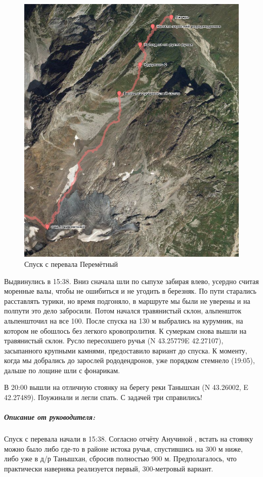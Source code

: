 \begin{figure}[h!]
	\centering
	\includegraphics[width=0.7\linewidth]{../pics/perem_down.png}
	\caption{Спуск с перевала Перемётный}
	\label{perem_down}
\end{figure} 

Выдвинулись в 15:38. Вниз сначала шли по сыпухе забирая влево, усердно считая моренные валы, чтобы не ошибиться и не угодить в березняк. По пути старались расставлять турики, но время подгоняло, в маршруте мы были не уверены и на полпути это дело забросили. Потом начался травянистый склон, альпеншток альпеншточил на все 100. После спуска на 130 м выбрались на курумник, на котором не обошлось без легкого кровопролития. К сумеркам снова вышли на травянистый склон. Русло пересохшего ручья (N 43.25779\degree E 42.27107\degree), засыпанного крупными камнями, предоставило вариант до спуска. К моменту, когда мы добрались до зарослей рододендронов, уже порядком стемнело (19:05), дальше по лощине шли с фонарикам. 

В 20:00 вышли на отличную стоянку на берегу реки Танышхан (N 43.26002, E 42.27489). Поужинали и легли спать. С задачей три справились! 

\subparagraph{Описание от руководителя:} 
Спуск с перевала начали в 15:38. Согласно отчёту Анучиной \cite{Anuchina2019}, встать на стоянку можно было либо где-то в районе истока ручья, спустившись на 300 м ниже, либо уже в д/р Танышхан, сбросив полностью 900 м. Предполагалось, что практически наверняка реализуется первый, 300-метровый вариант. 

